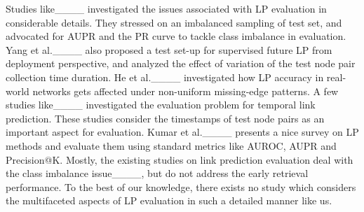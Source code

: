 Studies like____ investigated the issues associated with LP evaluation in considerable details. They stressed on an imbalanced sampling of test set, and advocated for AUPR and the PR curve to tackle class imbalance in evaluation. Yang et al.____ also proposed a test set-up for supervised future LP from deployment perspective, and analyzed the effect of variation of the test node pair collection time duration. He et al.____ investigated how LP accuracy in real-world networks gets affected under non-uniform missing-edge patterns. A few studies like____ investigated the evaluation problem for temporal link prediction. These studies consider the timestamps of test node pairs as an important aspect for evaluation. Kumar et al.____ presents a nice survey on LP methods and evaluate them using standard metrics like AUROC, AUPR and Precision@K. Mostly, the existing studies on link prediction evaluation deal with the class imbalance issue____, but do not address the early retrieval performance. To the best of our knowledge, there exists no study which considers the multifaceted aspects of LP evaluation in such a detailed manner like us.